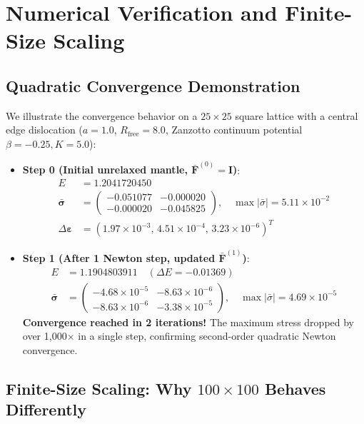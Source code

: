 \documentclass[11pt,a4paper]{article}
\begin{document}
\section{Numerical Verification and Finite-Size Scaling}

\subsection{Quadratic Convergence Demonstration}

We illustrate the convergence behavior on a $25 \times 25$ square lattice with a central edge dislocation ($a = 1.0$, $R_{\text{free}} = 8.0$, Zanzotto continuum potential $\beta = -0.25, K = 5.0$):
\begin{itemize}
    \item \textbf{Step 0 (Initial unrelaxed mantle, $\bar{\mathbf{F}}^{(0)} = \mathbf{I}$)}:
    \begin{align*}
    E &= 1.2041720450 \\
    \bar{\boldsymbol{\sigma}} &= \begin{pmatrix} -0.051077 & -0.000020 \\ -0.000020 & -0.045825 \end{pmatrix}, \quad \max|\bar{\sigma}| = 5.11 \times 10^{-2} \\
    \Delta\boldsymbol{\varepsilon} &= (1.97 \times 10^{-3}, \, 4.51 \times 10^{-4}, \, 3.23 \times 10^{-6})^T
    \end{align*}
    \item \textbf{Step 1 (After 1 Newton step, updated $\bar{\mathbf{F}}^{(1)}$)}:
    \begin{align*}
    E &= 1.1904803911 \quad (\Delta E = -0.01369) \\
    \bar{\boldsymbol{\sigma}} &= \begin{pmatrix} -4.68 \times 10^{-5} & -8.63 \times 10^{-6} \\ -8.63 \times 10^{-6} & -3.38 \times 10^{-5} \end{pmatrix}, \quad \max|\bar{\sigma}| = 4.69 \times 10^{-5}
    \end{align*}
    \textbf{Convergence reached in 2 iterations!} The maximum stress dropped by over 1,000$\times$ in a single step, confirming second-order quadratic Newton convergence.
\end{itemize}

\subsection{Finite-Size Scaling: Why \texorpdfstring{$100 \times 100$}{100x100} Behaves Differently}
\end{document}
